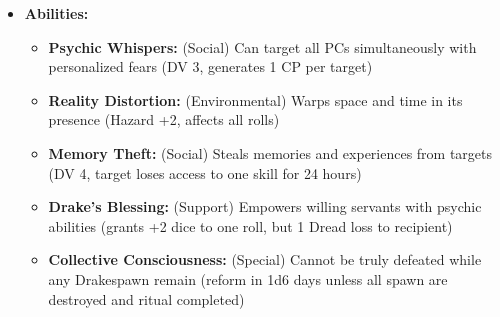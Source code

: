 \documentclass[11pt]{article}
\begin{document}
\begin{itemize}
  \item \textbf{Abilities:}
    \begin{itemize}
    \item \textbf{Psychic Whispers:} (Social) Can target all PCs simultaneously with personalized fears (DV 3, generates 1 CP per target)
    \item \textbf{Reality Distortion:} (Environmental) Warps space and time in its presence (Hazard +2, affects all rolls)
    \item \textbf{Memory Theft:} (Social) Steals memories and experiences from targets (DV 4, target loses access to one skill for 24 hours)
    \item \textbf{Drake's Blessing:} (Support) Empowers willing servants with psychic abilities (grants +2 dice to one roll, but 1 Dread loss to recipient)
    \item \textbf{Collective Consciousness:} (Special) Cannot be truly defeated while any Drakespawn remain (reform in 1d6 days unless all spawn are destroyed and ritual completed)
    \end{itemize}
\end{itemize}
\end{document}
